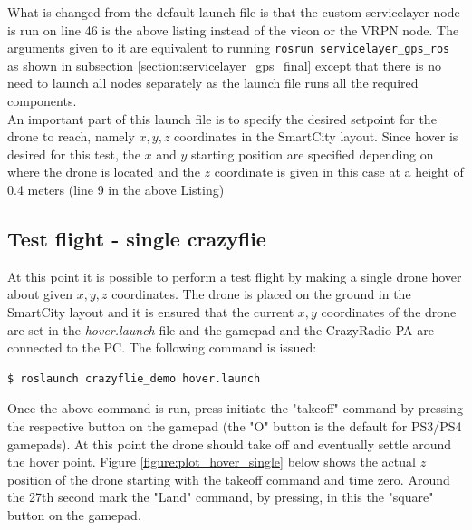 \noindent What is changed from the default launch file is that the custom servicelayer node is run on line 46 is the above listing instead of the vicon or the VRPN node. The arguments given to it are equivalent to running \texttt{rosrun servicelayer\_gps\_ros} as shown in subsection \ref{section:servicelayer_gps_final} except that there is no need to launch all nodes separately as the launch file runs all the required components.\\
An important part of this launch file is to specify the desired setpoint for the drone to reach, namely $x, y, z$ coordinates in the SmartCity layout. Since hover is desired for this test, the $x$ and $y$ starting position are specified depending on where the drone is located and the $z$ coordinate is given in this case at a height of 0.4 meters (line 9 in the above Listing)

\subsection{Test flight - single crazyflie}
At this point it is possible to perform a test flight by making a single drone hover about given $x, y, z$ coordinates. The drone is placed on the ground in the SmartCity layout and it is ensured that the current $x,y$ coordinates of the drone are set in the \textit{hover.launch} file and the gamepad and the CrazyRadio PA are connected to the PC. The following command is issued:
\begin{mdframed}[backgroundcolor=light-gray, linecolor=light-gray]
\begin{verbatim}
$ roslaunch crazyflie_demo hover.launch
\end{verbatim}
\end{mdframed}

\noindent Once the above command is run, press initiate the "takeoff" command by pressing the respective button on the gamepad (the "O" button is the default for PS3/PS4 gamepads).
At this point the drone should take off and eventually settle around the hover point. Figure \ref{figure:plot_hover_single} below shows the actual $z$ position of the drone starting with the takeoff command and time zero. Around the 27th second mark the "Land" command, by pressing, in this the "square" button on the gamepad.


